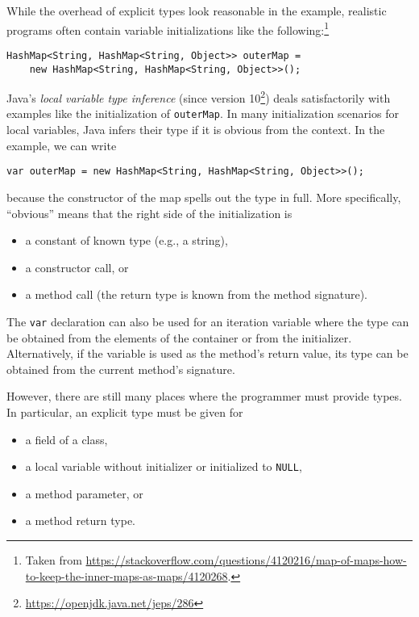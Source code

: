 While the overhead of explicit types look reasonable in the example,
realistic programs often contain variable initializations like
the following:\footnote{Taken from
  \url{https://stackoverflow.com/questions/4120216/map-of-maps-how-to-keep-the-inner-maps-as-maps/4120268}.} 
\begin{lstlisting}[basicstyle=\ttfamily\fontsize{8}{9.6}\selectfont,style=fgj]
  HashMap<String, HashMap<String, Object>> outerMap =
    new HashMap<String, HashMap<String, Object>>();
\end{lstlisting}

Java's \emph{local variable type inference} (since version 10\footnote{\url{https://openjdk.java.net/jeps/286}}) deals
satisfactorily with examples like the initialization of
\lstinline{outerMap}. 
In many initialization scenarios for local variables, Java infers their type
if it is obvious from the context. In the
example, we can write
\begin{lstlisting}[basicstyle=\ttfamily\fontsize{8}{9.6}\selectfont,style=fgj]
var outerMap = new HashMap<String, HashMap<String, Object>>();
\end{lstlisting}
because the constructor of the map spells out the type in
full. More specifically, ``obvious'' means that the right side of the initialization is
\begin{itemize}
\item a constant of known type (e.g., a string),
\item a constructor call, or
\item a method call (the return type is known from the method
  signature).
\end{itemize}
The \lstinline{var} declaration can also be used for an iteration
variable where the type can be obtained from the elements of the
container or from the initializer.
Alternatively, if the variable is used as the method's return value,
its type can be obtained from the current method's signature.

However, there are still many places where the programmer must provide types. In
particular, an explicit type must be given for
\begin{itemize}
\item a field of a class,
\item a local variable without initializer or initialized to \lstinline{NULL},
\item a method parameter, or
\item a method return type.
\end{itemize}

